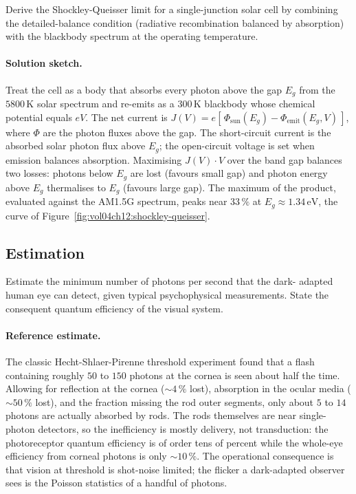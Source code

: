 \begin{exercise}
Derive the Shockley-Queisser limit for a single-junction solar cell
by combining the detailed-balance condition (radiative recombination
balanced by absorption) with the blackbody spectrum at the
operating temperature.
\paragraph{Solution sketch.} Treat the cell as a body that absorbs
every photon above the gap $E_{g}$ from the $5800\,\si{\kelvin}$ solar
spectrum and re-emits as a $300\,\si{\kelvin}$ blackbody whose chemical
potential equals $eV$. The net current is $J(V) = e[\,\Phi_{\text{sun}}(
E_{g}) - \Phi_{\text{emit}}(E_{g}, V)\,]$, where $\Phi$ are the photon
fluxes above the gap. The short-circuit current is the absorbed solar
photon flux above $E_{g}$; the open-circuit voltage is set when emission
balances absorption. Maximising $J(V)\cdot V$ over the band gap balances
two losses: photons below $E_{g}$ are lost (favours small gap) and
photon energy above $E_{g}$ thermalises to $E_{g}$ (favours large gap).
The maximum of the product, evaluated against the AM1.5G spectrum,
peaks near $33\,\%$ at $E_{g} \approx 1.34\,\si{\electronvolt}$, the
curve of Figure~\ref{fig:vol04ch12:shockley-queisser}.
\end{exercise}

\subsection*{Estimation}

\begin{exercise}
Estimate the minimum number of photons per second that the dark-
adapted human eye can detect, given typical psychophysical
measurements. State the consequent quantum efficiency of the visual
system.
\paragraph{Reference estimate.} The classic Hecht-Shlaer-Pirenne
threshold experiment found that a flash containing roughly $50$ to
$150$ photons at the cornea is seen about half the time. Allowing for
reflection at the cornea ($\sim 4\,\%$ lost), absorption in the ocular
media ($\sim 50\,\%$ lost), and the fraction missing the rod outer
segments, only about $5$ to $14$ photons are actually absorbed by rods.
The rods themselves are near single-photon detectors, so the
inefficiency is mostly delivery, not transduction: the photoreceptor
quantum efficiency is of order tens of percent while the whole-eye
efficiency from corneal photons is only $\sim 10\,\%$. The operational
consequence is that vision at threshold is shot-noise limited; the
flicker a dark-adapted observer sees is the Poisson statistics of a
handful of photons.
\end{exercise}

